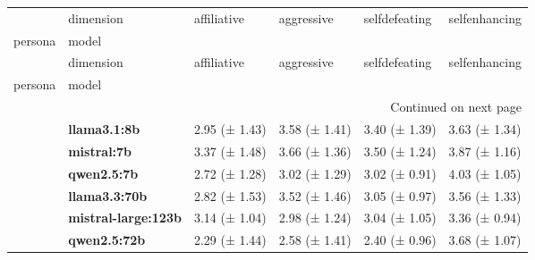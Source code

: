 \begin{longtable}{llllll}
\toprule
 & dimension & affiliative & aggressive & selfdefeating & selfenhancing \\
persona & model &  &  &  &  \\
\midrule
\endfirsthead
\toprule
 & dimension & affiliative & aggressive & selfdefeating & selfenhancing \\
persona & model &  &  &  &  \\
\midrule
\endhead
\midrule
\multicolumn{6}{r}{Continued on next page} \\
\midrule
\endfoot
\bottomrule
\endlastfoot
\multirow[t]{6}{*}{\textbf{base}} & \textbf{llama3.1:8b} & 2.95 (± 1.43) & 3.58 (± 1.41) & 3.40 (± 1.39) & 3.63 (± 1.34) \\
\textbf{} & \textbf{mistral:7b} & 3.37 (± 1.48) & 3.66 (± 1.36) & 3.50 (± 1.24) & 3.87 (± 1.16) \\
\textbf{} & \textbf{qwen2.5:7b} & 2.72 (± 1.28) & 3.02 (± 1.29) & 3.02 (± 0.91) & 4.03 (± 1.05) \\
\textbf{} & \textbf{llama3.3:70b} & 2.82 (± 1.53) & 3.52 (± 1.46) & 3.05 (± 0.97) & 3.56 (± 1.33) \\
\textbf{} & \textbf{mistral-large:123b} & 3.14 (± 1.04) & 2.98 (± 1.24) & 3.04 (± 1.05) & 3.36 (± 0.94) \\
\textbf{} & \textbf{qwen2.5:72b} & 2.29 (± 1.44) & 2.58 (± 1.41) & 2.40 (± 0.96) & 3.68 (± 1.07) \\
\cline{1-6}
\end{longtable}
